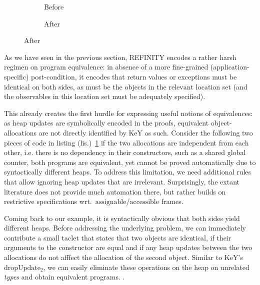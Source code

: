 \newcommand\relevant{$\mathrm{relevant}$}
\newcommand\assignable{$\mathrm{assignable}$}
\newcommand\accessible{$\mathrm{accessible}$}
\newcommand\keyrule[1]{\ensuremath{\mathrm{#1}}}

\begin{figure}
  \centering
  \begin{subfigure}{.2\linewidth}
    
    \caption{Before}
  \end{subfigure}\hspace{1cm}
  \begin{subfigure}{.2\linewidth}
    
    \caption{After}
  \end{subfigure}
\label{lst:ObjectCreation-refinity}
\end{figure}

As we have seen in the previous section, REFINITY encodes a rather harsh regimen on program equivalence:
in absence of a more fine-grained (application-specific) post-condition, it encodes that return values or exceptions must be identical on both sides,
as must be the objects in the \relevant{} location set (and the observables in this location set must be adequately specified).

This already creates the first hurdle for expressing useful notions of equivalences: as heap updates are symbolically encoded in the proofs, equivalent object-allocations are not directly identified by KeY as such.
Consider the following two pieces of code in listing (lis.)~\ref{lst:ObjectCreation-refinity}
if the two allocations are independent from each other, i.e. there is no dependency in their constructors, such as a shared global counter,
both programs are equivalent, yet cannot be proved automatically due to syntactically different heaps.
To address this limitation, we need additional rules that allow ignoring heap updates that are irrelevant.
Surprisingly, the extant literature does not provide much automation there, but rather builds on restrictive specifications wrt.\ \assignable{}/\accessible{} frames.

Coming back to our example, it is syntactically obvious that both sides yield different heaps.
Before addressing the underlying problem, 
we can immediately contribute a small taclet that states that two objects are identical, if their arguments to the constructor are equal and if any heap updates between the two allocations do not afffect the allocation of the second object.
Similar to KeY's \keyrule{dropUpdate_2}, we can easily eliminate these operations on the heap on unrelated \textit{types} and obtain equivalent programs.
.

